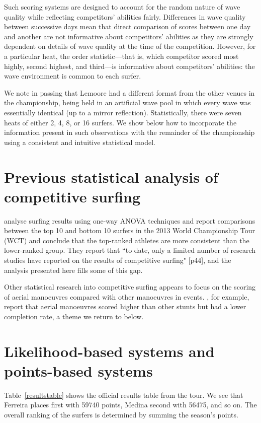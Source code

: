 \documentclass{article}
\begin{document}
Such scoring systems are designed to account for the random nature of
wave quality while reflecting competitors' abilities fairly.
Differences in wave quality between successive days mean that direct
comparison of scores between one day and another are not informative
about competitors' abilities as they are strongly dependent on details
of wave quality at the time of the competition.  However, for a
particular heat, the order statistic---that is, which competitor
scored most highly, second highest, and third---is informative about
competitors' abilities: the wave environment is common to each surfer.

We note in passing that Lemoore had a different format from the other
venues in the championship, being held in an artificial wave pool in
which every wave was essentially identical (up to a mirror
reflection).  Statistically, there were seven heats of either 2, 4, 8,
or 16 surfers.  We show below how to incorporate the information
present in such observations with the remainder of the championship
using a consistent and intuitive statistical model.

\section{Previous statistical analysis of competitive surfing}

\citet{farley2013} analyse surfing results using
one-way ANOVA techniques and report comparisons between the top 10 and
bottom 10 surfers in the 2013 World Championship Tour (WCT) and conclude
that the top-ranked athletes are more consistent than the lower-ranked
group.  They report that ``to date, only a limited number of research
studies have reported on the results of competitive surfing" [p44],
and the analysis presented here fills some of this gap.

Other statistical research into competitive surfing appears to focus
on the scoring of aerial manoeuvres compared with other manoeuvres in
events.  \citet{lundgren2014}, for example,
report that aerial manoeuvres scored higher than other stunts but had
a lower completion rate, a theme we return to below.

\section{Likelihood-based systems and points-based systems}

Table~\ref{resultstable} shows the official results table from the
tour.  We see that Ferreira places first with 59740 points, Medina
second with 56475, and so on.  The overall ranking of the surfers is
determined by summing the season's points.
\end{document}
